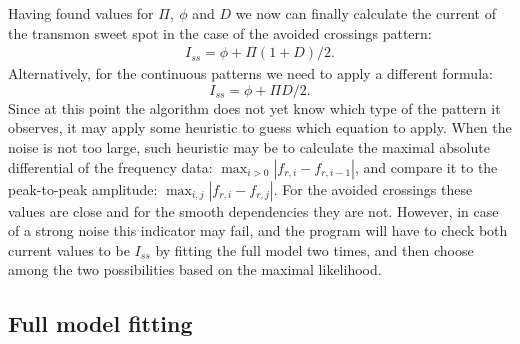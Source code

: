 \documentclass[%
 aip,
 draft,
 amsmath,amssymb,
 reprint,%
]{revtex4-1}
\begin{document}
Having found values for $\Pi,\ \phi$ and $D$ we now can finally calculate the current of the transmon sweet spot in the case of the avoided crossings pattern:
\begin{align*}
I_{ss} = 
 \phi + \Pi (1+D)/2.
\end{align*}
Alternatively, for the continuous patterns we need to apply a different formula:
\begin{equation*}
I_{ss} = \phi + \Pi D/2.
\end{equation*}
Since at this point the algorithm does not yet know which type of the pattern it observes, it may apply some heuristic to guess which equation to apply. When the noise is not too large, such heuristic may be to calculate the maximal absolute differential of the frequency data: $\max_{i>0} |f_{r,i} - f_{{r,i}-1}|$, and compare it to the peak-to-peak amplitude: $\max_{i,j} | f_{r,i} - f_{r, j}|$. For the avoided crossings these values are close and for the smooth dependencies they are not. However, in case of a strong noise this indicator may fail, and the program will have to check both current values to be $I_{ss}$ by fitting the full model two times, and then choose among the two possibilities based on the maximal likelihood.


\subsection{Full model fitting}
\end{document}
